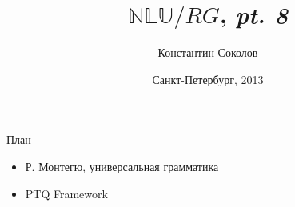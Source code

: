 \documentclass{beamer}
\begin{document}
\title{\huge{$\mathbb{NLU}/RG$, \textit{pt. 8}}}
\author{Константин Соколов}
\date{Санкт-Петербург, 2013} 
\begin{frame}
    \thispagestyle{empty}
    \titlepage
\end{frame}

\begin{frame}{План}
    \setcounter{framenumber}{1}
    \begin{itemize}
        \item Р. Монтегю, универсальная грамматика
        \item PTQ Framework
    \end{itemize}
\end{frame}



\end{document}
